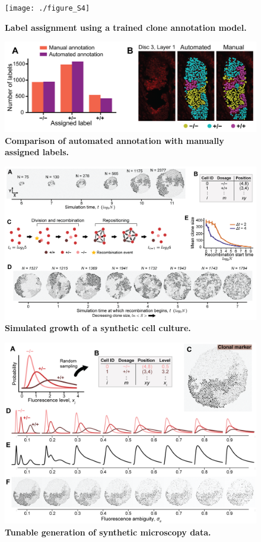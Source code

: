 \documentclass[10pt,letterpaper]{article}
\begin{document}
\begin{figure}[h]
\centering
\texttt{[image: ./figure\_S4]}
\caption{\textbf{Label assignment using a trained clone annotation model.}}
\end{figure}
\pagebreak

\begin{figure}[h]
\centering
\includegraphics[scale=1.0]{./figure_S5}
\caption{\textbf{Comparison of automated annotation with manually assigned labels.}}
\end{figure}
\pagebreak

\begin{figure}[h]
\centering
\includegraphics[width=1.0\columnwidth]{./figure_S6}
\caption{\textbf{Simulated growth of a synthetic cell culture.}}
\end{figure}
\pagebreak

\begin{figure}[h]
\centering
\includegraphics[width=1.0\columnwidth]{./figure_S7}
\caption{\textbf{Tunable generation of synthetic microscopy data.}}
\end{figure}
\pagebreak
\end{document}
